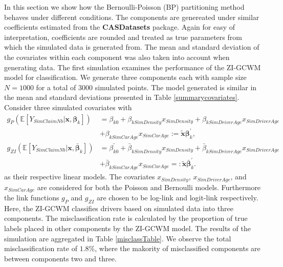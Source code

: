 \documentclass[12pt,letterpaper]{article}
\numberwithin{equation}{section}
\numberwithin{equation}{section}
\numberwithin{equation}{section}
\newcommand{\xTilda}{\tilde{\bm{x}}}
\begin{document}
In this section we show how the Bernoulli-Poisson (BP) partitioning method behaves under different conditions. The components are genereated under similar coefficients estimated from the \textbf{CASDatasets} package. Again for easy of interpretation, coefficients are rounded and treated as true parameters from which the simulated data is generated from. The mean and standard deviation of the covariates within each component was also taken into account when generating data. The first simulation examines the performance of the ZI-GCWM model for classification. We generate three components each with sample size $N=1000$ for a total of $3000$ simulated points.
The model generated is similar in the mean and standard deviations presented in Table \ref{summarycovariates}. Consider three simulated covariates with 
\begin{align}
g_P(\mathbb{E}\left[Y_{SimClaimNb}|\bm{x}, \bm{\beta}_k \right]) & = 
  \beta_{k0} +  \beta_{kSimDensity} x_{SimDensity} +  \beta_{kSimDriverAge} x_{SimDriverAge} \nonumber  \\ & + 
   \beta_{kSimCarAge} x_{SimCarAge} := \bm{\xTilda} \bm{\beta}_k^{'},  \label{poissonRegSim} \\
g_{ZI}(\mathbb{E}\left[Y_{SimClaimNb}|\bm{x} , \bar{\bm{\beta}}_k  \right]) & = 
  \bar{\beta_{k0}} +  \bar{\beta}_{kSimDensity} x_{SimDensity} +  \bar{\beta}_{kSimDriverAge} x_{SimDriverAge} \nonumber \\ & + 
  \bar{ \beta}_{kSimCarAge} x_{SimCarAge} =: \bm{\xTilda} \bar{\bm{\beta}}_k^{'}.  \label{zeroRegSim}
\end{align}
as their respective linear models.  The covariates $x_{SimDensity}$, $x_{SimDriverAge}$, and $x_{SimCarAge}$ are considered for both the Poisson and Bernoulli models. Furthermore the link functions $g_P$ and $g_{ZI}$ are chosen to be log-link and logit-link respectively. 
 Here, the ZI-GCWM classifies drivers based on simulated data into three components. The misclassification rate is calculated by the proportion of true labels placed in other components by the ZI-GCWM model.  The results of the simulation are aggregated in Table \ref{misclassTable}. We observe the total misclassification rate of $1.8 \% $, where the makority of misclassified components are between components two and three.
\end{document}
